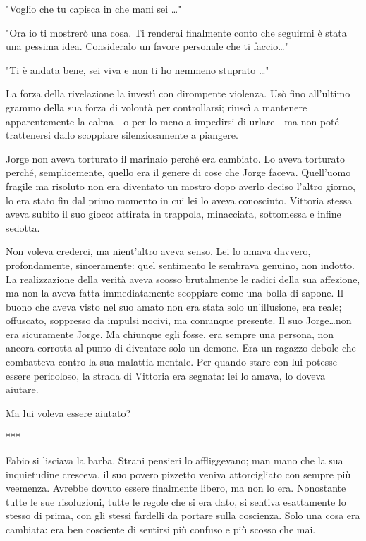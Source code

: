 "Voglio che tu capisca in che mani sei \ldots"

"Ora io ti mostrerò una cosa. Ti renderai finalmente conto che seguirmi è stata una pessima idea. Consideralo un favore personale che ti faccio\ldots"

"Ti è andata bene, sei viva e non ti ho nemmeno stuprato \ldots"

La forza della rivelazione la investì con dirompente violenza. Usò fino all'ultimo grammo della sua forza di volontà per controllarsi; riuscì a mantenere apparentemente la calma - o per lo meno a impedirsi di urlare - ma non poté trattenersi dallo scoppiare silenziosamente a piangere.

Jorge non aveva torturato il marinaio perché era cambiato. Lo aveva torturato perché, semplicemente, quello era il genere di cose che Jorge faceva. Quell'uomo fragile ma risoluto non era diventato un mostro dopo averlo deciso l'altro giorno, lo era stato fin dal primo momento in cui lei lo aveva conosciuto. Vittoria stessa aveva subito il suo gioco: attirata in trappola, minacciata, sottomessa e infine sedotta.

Non voleva crederci, ma nient'altro aveva senso. Lei lo amava davvero, profondamente, sinceramente: quel sentimento le sembrava genuino, non indotto. La realizzazione della verità aveva scosso brutalmente le radici della sua affezione, ma non la aveva fatta immediatamente scoppiare come una bolla di sapone. Il buono che aveva visto nel suo amato non era stata solo un'illusione, era reale; offuscato, soppresso da impulsi nocivi, ma comunque presente. Il suo Jorge\ldots non era sicuramente Jorge. Ma chiunque egli fosse, era sempre una persona, non ancora corrotta al punto di diventare solo un demone. Era un ragazzo debole che combatteva contro la sua malattia mentale. Per quando stare con lui potesse essere pericoloso, la strada di Vittoria era segnata: lei lo amava, lo doveva aiutare.

Ma lui voleva essere aiutato?

***

Fabio si lisciava la barba. Strani pensieri lo affliggevano; man mano che la sua inquietudine cresceva, il suo povero pizzetto veniva attorcigliato con sempre più veemenza. Avrebbe dovuto essere finalmente libero, ma non lo era. Nonostante tutte le sue risoluzioni, tutte le regole che si era dato, si sentiva esattamente lo stesso di prima, con gli stessi fardelli da portare sulla coscienza. Solo una cosa era cambiata: era ben cosciente di sentirsi più confuso e più scosso che mai.

